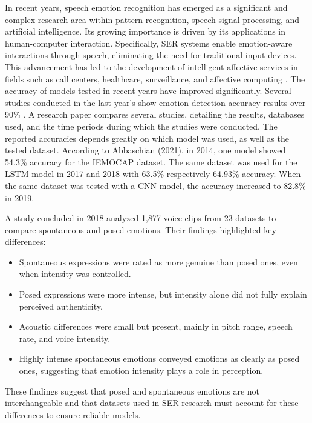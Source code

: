 In recent years, speech emotion recognition has emerged as a significant and complex research area within pattern recognition, speech signal processing, and artificial intelligence. Its growing importance is driven by its applications in human-computer interaction. Specifically, SER systems enable emotion-aware interactions through speech, eliminating the need for traditional input devices. This advancement has led to the development of intelligent affective services in fields such as call centers, healthcare, surveillance, and affective computing \autocite{Zhang2021}. The accuracy of models tested in recent years have improved significantly. Several studies conducted in the last year’s show emotion detection accuracy results over 90\% \autocite{Adebiyi2024, Praseetha2022, Rahman2024}. A research paper \autocite{Abbaschian2021} compares several studies, detailing the results, databases used, and the time periods during which the studies were conducted. The reported accuracies depends greatly on which model was used, as well as the tested dataset. According to Abbaschian (2021), in 2014, one model showed 54.3\% accuracy for the IEMOCAP dataset. The same dataset was used for the LSTM model in 2017 and 2018 with 63.5\% respectively 64.93\% accuracy. When the same dataset was tested with a CNN-model, the accuracy increased to 82.8\% in 2019.  

A study \autocite{Juslin2018} concluded in 2018 analyzed 1,877 voice clips from 23 datasets to compare spontaneous and posed emotions. Their findings highlighted key differences: 
\begin{itemize}
    \item Spontaneous expressions were rated as more genuine than posed ones, even when intensity was controlled. 
    \item Posed expressions were more intense, but intensity alone did not fully explain perceived authenticity. 
    \item Acoustic differences were small but present, mainly in pitch range, speech rate, and voice intensity. 
    \item Highly intense spontaneous emotions conveyed emotions as clearly as posed ones, suggesting that emotion intensity plays a role in perception. 
\end{itemize}
These findings suggest that posed and spontaneous emotions are not interchangeable and that datasets used in SER research must account for these differences to ensure reliable models. 

